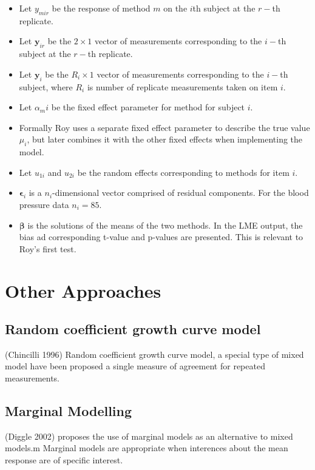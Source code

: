 \documentclass[12pt, a4paper]{report}
\theoremstyle{plain}
\theoremstyle{definition}
\theoremstyle{remark}
\begin{document}
\begin{itemize}
	\item Let $y_{mir}$ be the response of method $m$ on the $i$th subject
	at the $r-$th replicate.
	\item Let $\boldsymbol{y}_{ir}$ be the $2 \times 1$ vector of measurements
	corresponding to the $i-$th subject at the $r-$th replicate.
	\item Let $\boldsymbol{y}_{i}$ be the $R_i \times 1$ vector of
	measurements corresponding to the $i-$th subject, where $R_i$ is number of replicate measurements taken on item $i$.
	\item Let $\alpha_mi$ be the fixed effect parameter for method for subject $i$.
	\item Formally Roy uses a separate fixed effect parameter to describe the true value $\mu_i$, but later combines it with the other fixed effects when implementing the model.
	\item Let $u_{1i}$ and $u_{2i}$ be the random effects corresponding to methods for item $i$.
	
	\item $\boldsymbol{\epsilon}_{i}$ is a $n_{i}$-dimensional vector
	comprised of residual components. For the blood pressure data $n_{i} = 85$.
	
	\item $\boldsymbol{\beta}$ is the solutions of the means of the two methods. In the LME output, the bias ad corresponding
	t-value and p-values are presented. This is relevant to Roy's first test.\end{itemize}

\section{Other Approaches}

\subsection{Random coefficient growth curve model} (Chincilli
1996) Random coefficient growth curve model, a special type of
mixed model have been proposed  a single measure of agreement for
repeated measurements.
\subsection{Marginal Modelling}
(Diggle 2002) proposes the use of marginal models as an
alternative to mixed models.m Marginal models are appropriate when
interences about the mean response are of specific interest.



\bigskip



\end{document}
